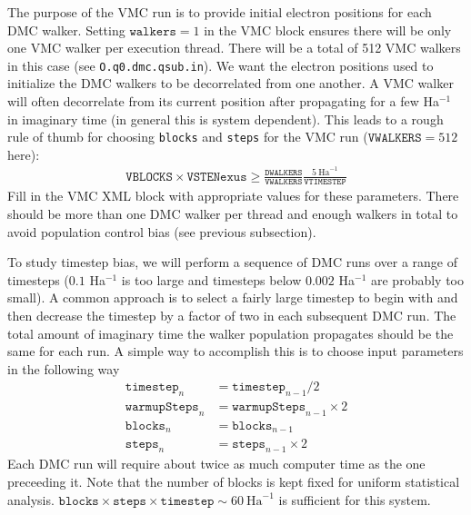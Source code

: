 The purpose of the VMC run is to provide initial electron positions for each DMC walker.  Setting $\texttt{walkers}=1$ in the VMC block ensures there will be only one VMC walker per execution thread.  There will be a total of 512 VMC walkers in this case (see \texttt{O.q0.dmc.qsub.in}).  We want the electron positions used to initialize the DMC walkers to be decorrelated from one another.  A VMC walker will often decorrelate from its current position after propagating for a few Ha$^{-1}$ in imaginary time (in general this is system dependent).  This leads to a rough rule of thumb for choosing \texttt{blocks} and \texttt{steps} for the VMC run ($\texttt{VWALKERS}=512$ here):
\begin{align}
  \texttt{VBLOCKS}\times\texttt{VSTENexus} \ge \frac{\texttt{DWALKERS}}{\texttt{VWALKERS}} \frac{5~\textrm{Ha}^{-1}}{\texttt{VTIMESTEP}}
\end{align}
Fill in the VMC XML block with appropriate values for these parameters.  There should be more than one DMC walker per thread and enough walkers in total to avoid population control bias (see previous subsection).

To study timestep bias, we will perform a sequence of DMC runs over a range of timesteps ($0.1$ Ha$^{-1}$ is too large and timesteps below $0.002$ Ha$^{-1}$ are probably too small).  A common approach is to select a fairly large timestep to begin with and then decrease the timestep by a factor of two in each subsequent DMC run.  The total amount of imaginary time the walker population propagates should be the same for each run.  A simple way to accomplish this is to choose input parameters in the following way
\begin{align}\label{eq:timestep_iter}
  \texttt{timestep}_{n}    &= \texttt{timestep}_{n-1}/2\nonumber\\
  \texttt{warmupSteps}_{n} &= \texttt{warmupSteps}_{n-1}\times 2\nonumber\\
  \texttt{blocks}_{n}      &= \texttt{blocks}_{n-1}\nonumber\\
  \texttt{steps}_{n}       &= \texttt{steps}_{n-1}\times 2
\end{align}
Each DMC run will require about twice as much computer time as the one preceeding it.  Note that the number of blocks is kept fixed for uniform statistical analysis.  $\texttt{blocks}\times\texttt{steps}\times\texttt{timestep}\sim 60~\mathrm{Ha}^{-1}$ is sufficient for this system.

